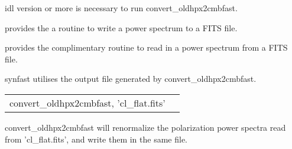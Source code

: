 \begin{related}
  \begin{sulist}{} %
    \item[idl] version \idlversion or more is necessary to run convert\_oldhpx2cmbfast.
    \item[\htmlref{cl2fits}{idl:cl2fits}] provides the a routine to write a
      power spectrum to a FITS file.
    \item[\htmlref{fits2cl}{idl:fits2cl}] provides the complimentary routine to read in a
      power spectrum from a FITS file.
    \item[synfast] utilises the output file generated by convert\_oldhpx2cmbfast.
  \end{sulist}
\end{related}

\begin{example}
{
\begin{tabular}{ll} %
convert\_oldhpx2cmbfast, 'cl\_flat.fits'
\end{tabular}
}
{
convert\_oldhpx2cmbfast will renormalize the polarization power spectra read
from 'cl\_flat.fits', and write them in the same file.
}
\end{example}


